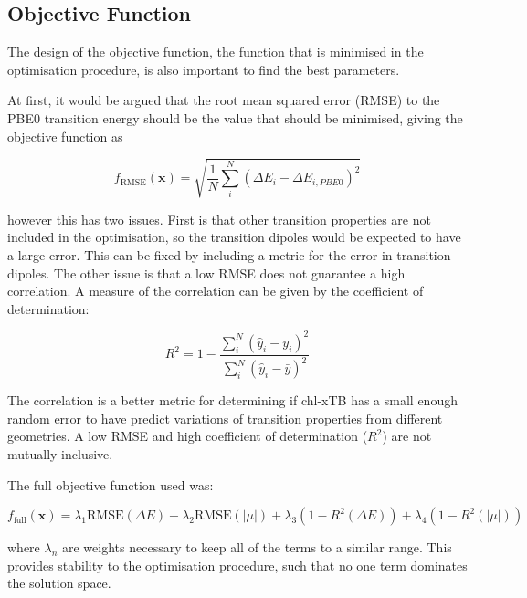 \subsection{Objective Function}
\label{subsec:obj_func}
The design of the objective function, the function that is minimised in the optimisation
procedure, is also important to find the best parameters.

At first, it would be argued that the root mean squared error (RMSE) to the PBE0 
transition energy should be the value that should be minimised, giving the objective
function as

\begin{equation}
f_{\text{RMSE}}\left(\mathbf{x}\right) = \sqrt{ \frac{1}{N} \sum^N_i \left( \Delta E_i  - \Delta E_{i, PBE0}\right)^2}
\end{equation}

however this has two issues. First is that other transition properties are not 
included in the optimisation, so the transition dipoles would be expected to have 
a large error. This can be fixed by including a metric for the error in transition dipoles.
The other issue is that a low RMSE does not guarantee a high correlation. A measure
of the correlation can be given by the coefficient of determination:

\begin{equation}
R^2 = 1 - \frac{\sum^N_i \left(\hat{y}_i - y_i \right)^2}{\sum^N_i \left(\hat{y}_i - \bar{y}\right)^2}
\end{equation}

The correlation is a better metric for determining if chl-xTB has a small enough random
error to have predict variations of transition properties from different geometries.
A low RMSE and high coefficient of determination ($R^2$) are not mutually inclusive.

The full objective function used was:

\begin{equation}
f_{\text{full}} \left( \mathbf{x} \right) = \lambda_1 \text{RMSE} \left(\Delta E \right)+ \lambda_2 \text{RMSE}\left( \left| \mu \right| \right) + \lambda_3 \left(1 - R^2 \left( \Delta E \right)\right) + \lambda_4 \left( 1 - R^2 \left( \left| \mu \right| \right)\right)
\end{equation}

where $\lambda_n$ are weights necessary to keep all of the terms to a similar range.
This provides stability to the optimisation procedure, such that no one term dominates
the solution space.


